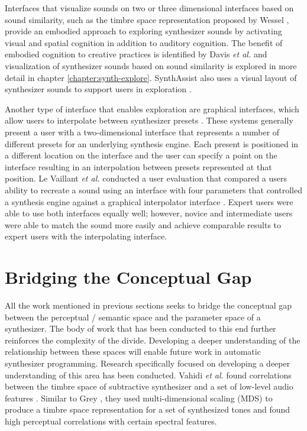 Interfaces that visualize sounds on two or three dimensional interfaces based on sound similarity, such as the timbre space representation proposed by Wessel \cite{wessel1979timbre}, provide an embodied approach to exploring synthesizer sounds by activating visual and spatial cognition in addition to auditory cognition. The benefit of embodied cognition to creative practices is identified by Davis \textit{et al.} \cite{davis2013toward} and visualization of synthesizer sounds based on sound similarity is explored in more detail in chapter \ref{chapter:synth-explore}. SynthAssist also uses a visual layout of synthesizer sounds to support users in exploration \cite{cartwright2014synthassist}.

Another type of interface that enables exploration are graphical interfaces, which allow users to interpolate between synthesizer presets \cite{gibson2020analyzing}. These systems generally present a user with a two-dimensional interface that represents a number of different presets for an underlying synthesis engine. Each present is positioned in a different location on the interface and the user can specify a point on the interface resulting in an interpolation between presets represented at that position. Le Vaillant \textit{et al.} conducted a user evaluation that compared a users ability to recreate a sound using an interface with four parameters that controlled a synthesis engine against a graphical interpolator interface \cite{le2020analytic}. Expert users were able to use both interfaces equally well; however, novice and intermediate users were able to match the sound more easily and achieve comparable results to expert users with the interpolating interface.

\section{Bridging the Conceptual Gap}
All the work mentioned in previous sections seeks to bridge the conceptual gap between the perceptual / semantic space and the parameter space of a synthesizer. The body of work that has been conducted to this end further reinforces the complexity of the divide. Developing a deeper understanding of the relationship between these spaces will enable future work in automatic synthesizer programming. Research specifically focused on developing a deeper understanding of this area has been conducted. Vahidi \textit{et al.} found correlations between the timbre space of subtractive synthesizer and a set of low-level audio features \cite{vahidi2020timbre}. Similar to Grey \cite{grey1977multidimensional}, they used multi-dimensional scaling (MDS) to produce a timbre space representation for a set of synthesized tones and found high perceptual correlations with certain spectral features. 

